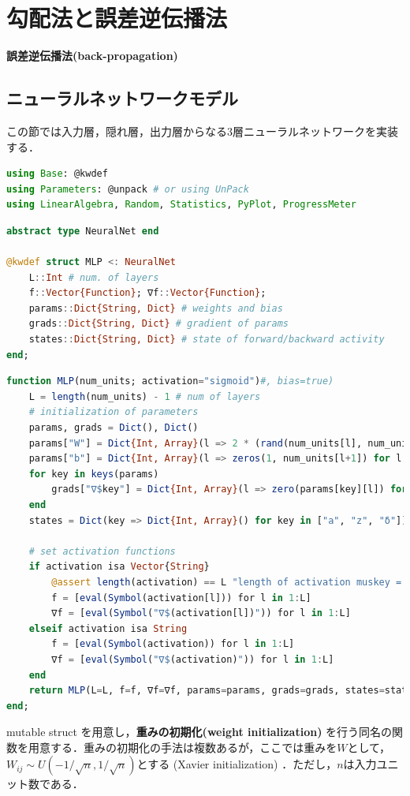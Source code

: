 \section{勾配法と誤差逆伝播法}
\textbf{誤差逆伝播法(back-propagation)}
\subsection{ニューラルネットワークモデル}
この節では入力層，隠れ層，出力層からなる3層ニューラルネットワークを実装する．
\begin{lstlisting}[language=julia]
using Base: @kwdef
using Parameters: @unpack # or using UnPack
using LinearAlgebra, Random, Statistics, PyPlot, ProgressMeter
\end{lstlisting}
\begin{lstlisting}[language=julia]
abstract type NeuralNet end

@kwdef struct MLP <: NeuralNet
    L::Int # num. of layers
    f::Vector{Function}; ∇f::Vector{Function};
    params::Dict{String, Dict} # weights and bias
    grads::Dict{String, Dict} # gradient of params
    states::Dict{String, Dict} # state of forward/backward activity
end;
\end{lstlisting}
\begin{lstlisting}[language=julia]
function MLP(num_units; activation="sigmoid")#, bias=true)
    L = length(num_units) - 1 # num of layers
    # initialization of parameters
    params, grads = Dict(), Dict()
    params["W"] = Dict{Int, Array}(l => 2 * (rand(num_units[l], num_units[l+1]) .- 0.5) / sqrt(num_units[l]) for l in 1:L)
    params["b"] = Dict{Int, Array}(l => zeros(1, num_units[l+1]) for l in 1:L)
    for key in keys(params)
        grads["∇$key"] = Dict{Int, Array}(l => zero(params[key][l]) for l in 1:L)
    end
    states = Dict(key => Dict{Int, Array}() for key in ["a", "z", "δ"])

    # set activation functions
    if activation isa Vector{String}
        @assert length(activation) == L "length of activation muskey = t be equal to L=$L, or use string"
        f = [eval(Symbol(activation[l])) for l in 1:L]
        ∇f = [eval(Symbol("∇$(activation[l])")) for l in 1:L]
    elseif activation isa String
        f = [eval(Symbol(activation)) for l in 1:L]
        ∇f = [eval(Symbol("∇$(activation)")) for l in 1:L]
    end
    return MLP(L=L, f=f, ∇f=∇f, params=params, grads=grads, states=states)
end;
\end{lstlisting}
mutable struct を用意し，\textbf{重みの初期化(weight initialization)} を行う同名の関数を用意する．重みの初期化の手法は複数あるが，ここでは重みを$W$として，$W_{ij} \sim U\left(-1/\sqrt{n}, 1/\sqrt{n}\right)$とする (Xavier initialization) \citep{Glorot2010-iu}．ただし，$n$は入力ユニット数である．
